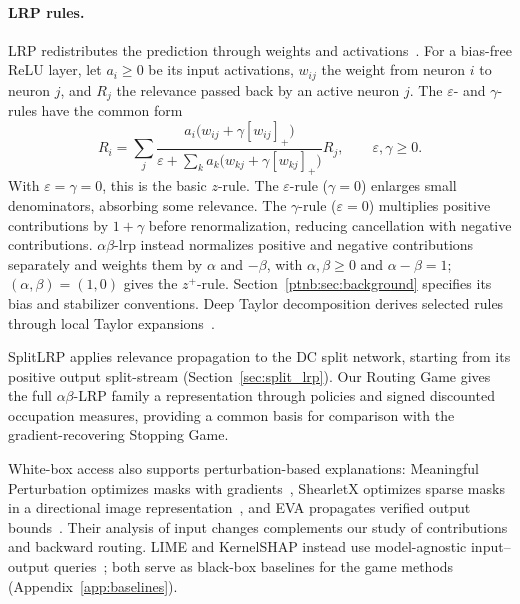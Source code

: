 \paragraph{LRP rules.}\label{par:lrp_rules}
LRP redistributes the prediction through weights and activations~\parencite{Bach2015,Montavon2018}. For a bias-free ReLU layer, let $a_i\ge0$ be its input activations, $w_{ij}$ the weight from neuron $i$ to neuron $j$, and $R_j$ the relevance passed back by an active neuron $j$. The $\varepsilon$- and $\gamma$-rules have the common form~\parencite{Montavon_2022_gammaLRP}
\begin{equation}\label{eq:lrp_gamma_overview}
 R_i=\sum_j\frac{a_i\bigl(w_{ij}+\gamma[w_{ij}]_+\bigr)}
 {\varepsilon+\sum_k a_k\bigl(w_{kj}+\gamma[w_{kj}]_+\bigr)}R_j,
 \qquad \varepsilon,\gamma\ge0.
\end{equation}
With $\varepsilon=\gamma=0$, this is the basic $z$-rule. The $\varepsilon$-rule ($\gamma=0$) enlarges small denominators, absorbing some relevance. The $\gamma$-rule ($\varepsilon=0$) multiplies positive contributions by $1+\gamma$ before renormalization, reducing cancellation with negative contributions. $\alpha\beta$-\ac{lrp} instead normalizes positive and negative contributions separately and weights them by $\alpha$ and $-\beta$, with $\alpha,\beta\ge0$ and $\alpha-\beta=1$; $(\alpha,\beta)=(1,0)$ gives the $z^+$-rule. Section~\ref{ptnb:sec:background} specifies its bias and stabilizer conventions. Deep Taylor decomposition derives selected rules through local Taylor expansions~\parencite{Montavon2017DeepTaylor}.

SplitLRP applies relevance propagation to the DC split network, starting from its positive output split-stream (Section~\ref{sec:split_lrp}). Our Routing Game gives the full $\alpha\beta$-LRP family a representation through policies and signed discounted occupation measures, providing a common basis for comparison with the gradient-recovering Stopping Game.

White-box access also supports perturbation-based explanations: Meaningful Perturbation optimizes masks with gradients~\parencite{FongVedaldi2017}, ShearletX optimizes sparse masks in a directional image representation~\parencite{Kolek2023_ShearletX}, and EVA propagates verified output bounds~\parencite{Fel2023_EVA}. Their analysis of input changes complements our study of contributions and backward routing. LIME and KernelSHAP instead use model-agnostic input--output queries~\parencite{Ribeiro2016,LundbergLee2017}; both serve as black-box baselines for the game methods (Appendix~\ref{app:baselines}).

